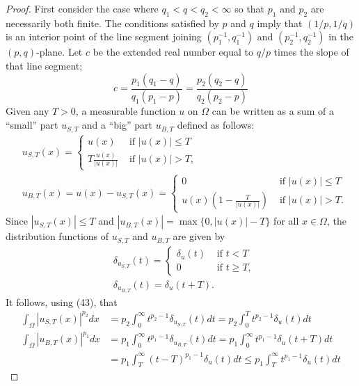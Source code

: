 \begin{proof}
  First consider the case where $q_1<q<q_2<\infty$ so that $p_1$ and $p_2$ are necessarily both finite. The conditions satisfied by $p$ and $q$ imply that $(1 / p, 1 / q)$ is an interior point of the line segment joining $\left(p_1^{-1}, q_1^{-1}\right)$ and $\left(p_2^{-1}, q_2^{-1}\right)$ in the $(p, q)$-plane. Let $c$ be the extended real number equal to $q / p$ times the slope of
  that line segment;
  \[
  c=\frac{p_1\left(q_1-q\right)}{q_1\left(p_1-p\right)}=\frac{p_2\left(q_2-q\right)}{q_2\left(p_2-p\right)}
  \]
  Given any $T>0$, a measurable function $u$ on $\Omega$ can be written as a sum of a ``small'' part $u_{S, T}$ and a ``big'' part $u_{B, T}$ defined as follows:
  \[
  \begin{aligned}
  & u_{S, T}(x)= \begin{cases}u(x) & \text { if }|u(x)| \leq T \\
  T \frac{u(x)}{|u(x)|} & \text { if }|u(x)|>T,\end{cases} \\
  & u_{B, T}(x)=u(x)-u_{S, T}(x)= \begin{cases}0 & \text { if }|u(x)| \leq T \\
  u(x)\left(1-\frac{T}{|u(x)|}\right) & \text { if }|u(x)|>T .\end{cases}
  \end{aligned}
  \]
  Since $\left|u_{S, T}(x)\right| \leq T$ and $\left|u_{B, T}(x)\right|=\max \{0,|u(x)|-T\}$ for all $x \in \Omega$, the distribution functions of $u_{S, T}$ and $u_{B, T}$ are given by
  \[
  \begin{aligned}
  & \delta_{u_{S, T}}(t)= \begin{cases}\delta_u(t) & \text { if } t<T \\
  0 & \text { if } t \geq T,\end{cases} \\
  & \delta_{u_{B, T}}(t)=\delta_u(t+T) .
  \end{aligned}
  \]
  It follows, using (43), that
  \[
  \begin{aligned}
  \int_{\Omega}\left|u_{S, T}(x)\right|^{p_2} d x & =p_2 \int_0^{\infty} t^{p_2-1} \delta_{u_{S, T}}(t) d t=p_2 \int_0^T t^{p_2-1} \delta_u(t) d t \\
  \int_{\Omega}\left|u_{B, T}(x)\right|^{p_1} d x & =p_1 \int_0^{\infty} t^{p_1-1} \delta_{u_{B, T}}(t) d t=p_1 \int_0^{\infty} t^{p_1-1} \delta_u(t+T) d t \\
  & =p_1 \int_T^{\infty}(t-T)^{p_1-1} \delta_u(t) d t \leq p_1 \int_T^{\infty} t^{p_1-1} \delta_u(t) d t

\end{aligned}\]
\end{proof}
